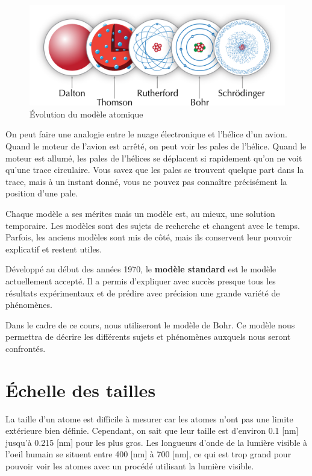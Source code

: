\documentclass[
  11pt,
  a4paper,
  openany]{book}
\begin{document}
\begin{figure}

{\centering \includegraphics[width=0.85\linewidth]{images/modeles-atomiques-evol-3} 

}

\caption{Évolution du modèle atomique}\label{fig:modeles-atomiques-evol-3}
\end{figure}

On peut faire une analogie entre le nuage électronique et l'hélice d'un avion. Quand le moteur de l'avion est arrêté, on peut voir les pales de l'hélice. Quand le moteur est allumé, les pales de l'hélices se déplacent si rapidement qu'on ne voit qu'une trace circulaire. Vous savez que les pales se trouvent quelque part dans la trace, mais à un instant donné, vous ne pouvez pas connaître précisément la position d'une pale.

Chaque modèle a ses mérites mais un modèle est, au mieux, une solution temporaire. Les modèles sont des sujets de recherche et changent avec le temps. Parfois, les anciens modèles sont mis de côté, mais ils conservent leur pouvoir explicatif et restent utiles.

Développé au début des années 1970, le \textbf{modèle standard} est le modèle actuellement accepté. Il a permis d'expliquer avec succès presque tous les résultats expérimentaux et de prédire avec précision une grande variété de phénomènes.

Dans le cadre de ce cours, nous utiliseront le modèle de Bohr. Ce modèle nous permettra de décrire les différents sujets et phénomènes auxquels nous seront confrontés.

\newpage

\section{Échelle des tailles}\label{uxe9chelle-des-tailles}

La taille d'un atome est difficile à mesurer car les atomes n'ont pas une limite extérieure bien définie. Cependant, on sait que leur taille est d'environ 0.1 {[}nm{]} jusqu'à 0.215 {[}nm{]} pour les plus gros. Les longueurs d'onde de la lumière visible à l'oeil humain se situent entre 400 {[}nm{]} à 700 {[}nm{]}, ce qui est trop grand pour pouvoir voir les atomes avec un procédé utilisant la lumière visible.
\end{document}

